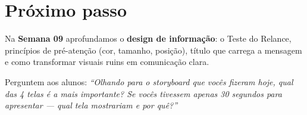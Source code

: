 \section{Próximo passo}

Na \textbf{Semana 09} aprofundamos o \textbf{design de informação}: o Teste do
Relance, princípios de pré-atenção (cor, tamanho, posição), título que carrega
a mensagem e como transformar visuais ruins em comunicação clara.

Perguntem aos alunos: \textit{``Olhando para o storyboard que vocês fizeram
hoje, qual das 4 telas é a mais importante? Se vocês tivessem apenas 30 segundos
para apresentar — qual tela mostrariam e por quê?''}
